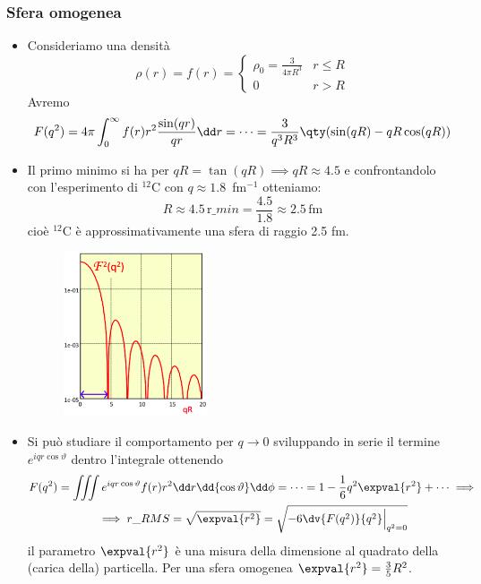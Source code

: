 \subsubsection{Sfera omogenea}
\begin{itemize}
    \item Consideriamo una densità
    \begin{equation*}
        \rho(r)=f(r)=
        \begin{cases}
            \rho_0=\frac3{4\pi R^3} & r\leq R\\
            0 & r>R
        \end{cases}
    \end{equation*}
    Avremo
    \begin{equation*}
    F(q^2)=4\pi\int_0^\infty f(r)r^2\frac{\sin(qr)}{qr}\dd r=\dots=\frac 3{q^3R^3}\qty(\sin(qR)-qR\cos(qR))
    \end{equation*}
    \item Il primo minimo si ha per $qR=\tan(qR)\implies qR\approx4.5$ e confrontandolo con l'esperimento di $^{12}$C con $q\approx1.8\,$ fm$^{-1}$ otteniamo:
    \[ 
    R\approx4.5\, \text{r}\_{min}=\frac{4.5}{1.8}\approx2.5\, \text{fm}
    \] 
    cioè $^{12}$C è approssimativamente una sfera di raggio 2.5 fm.
    \begin{figure}[H]
        \centering
        \includegraphics[width=0.4\textwidth]{immagini/fig_min_F_q.png}
    \end{figure}
    \item Si può studiare il comportamento per $q\to0$ sviluppando in serie il termine $e^{iqr\cos\vartheta}$ dentro l'integrale ottenendo
    \begin{gather*}
    F(q^2)=\iiint e^{iqr\cos\vartheta}f(r)r^2\dd r\dd{\cos\vartheta}\dd\phi =\dots=1-\frac16q^2\expval{r^2}+\dots\implies \\\implies r\_{RMS}=\sqrt{\expval{r^2}}=\sqrt{-6\dv{F(q^2)}{q^2}\Big|_{q^2=0}}
    \end{gather*}
    il parametro $\expval{r^2}$ è una misura della dimensione al quadrato della  (carica della) particella. Per una sfera omogenea $\expval{r^2}=\frac35R^2$.
\end{itemize}
